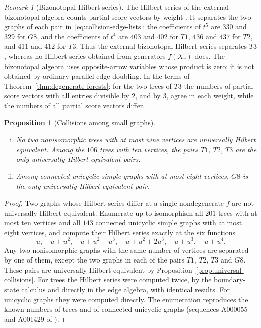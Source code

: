 \documentclass[reqno]{article}
\theoremstyle{plain} %
\newtheorem{proposition}[theorem]{Proposition}
\theoremstyle{definition}
\theoremstyle{remark}
\newtheorem{remark}[theorem]{\sc Remark}
\numberwithin{equation}{section}
\begin{document}
\begin{remark}[Bizonotopal Hilbert series]\label{rem:bizonotopal-pairs}
The Hilbert series of the external bizonotopal algebra counts partial
score vectors by weight \cite[Corollary~2.6]{KNSV}. It separates the two
graphs of each pair in~\eqref{eq:collision-edge-lists}: the coefficients
of $t^5$ are $330$ and $329$ for $G8$, and the coefficients of $t^4$ are
$403$ and $402$ for $T1$, $436$ and $437$ for $T2$, and $411$ and $412$
for $T3$. Thus the external bizonotopal Hilbert series separates $T3$, whereas
no Hilbert series obtained from generators $f(X_v)$ does. The
bizonotopal algebra uses opposite-arrow variables whose product is zero;
it is not obtained by ordinary parallel-edge doubling. In the terms of
Theorem~\ref{thm:degenerate-forests}: for the two trees of $T3$ the
numbers of partial score vectors with all entries divisible by $2$, and
by $3$, agree in each weight, while the numbers of all partial score
vectors differ.
\end{remark}

\begin{proposition}[Collisions among small graphs]
\label{prop:small-collisions}
\leavevmode
\begin{enumerate}[(i)]
\item No two nonisomorphic trees with at most nine vertices are
universally Hilbert equivalent. Among the $106$ trees with ten vertices,
the pairs $T1$, $T2$, $T3$ are the only universally Hilbert equivalent
pairs.
\item Among connected unicyclic simple graphs with at most eight
vertices, $G8$ is the only universally Hilbert equivalent pair.
\end{enumerate}
\end{proposition}
\begin{proof}
Two graphs whose Hilbert series differ at a single nondegenerate $f$ are
not universally Hilbert equivalent. Enumerate up to isomorphism all
$201$ trees with at most ten vertices and all $143$ connected unicyclic
simple graphs with at most eight vertices, and compute their Hilbert
series exactly at the six functions
\[
u,\quad u+u^2,\quad u+u^2+u^3,\quad u+u^2+2u^3,\quad u+u^3,\quad u+u^4.
\]
Any two nonisomorphic graphs with the same number of vertices are
separated by one of them, except the two graphs in each of the pairs
$T1$, $T2$, $T3$ and $G8$. These pairs are universally Hilbert
equivalent by Proposition~\ref{prop:universal-collisions}. For trees the
Hilbert series were computed twice, by the boundary-state calculus and
directly in the edge algebra, with identical results. For unicyclic
graphs they were computed directly. The enumeration reproduces the
known numbers of trees and of connected unicyclic graphs (sequences
A000055 and A001429 of \cite{OEIS}).
\end{proof}
\end{document}
